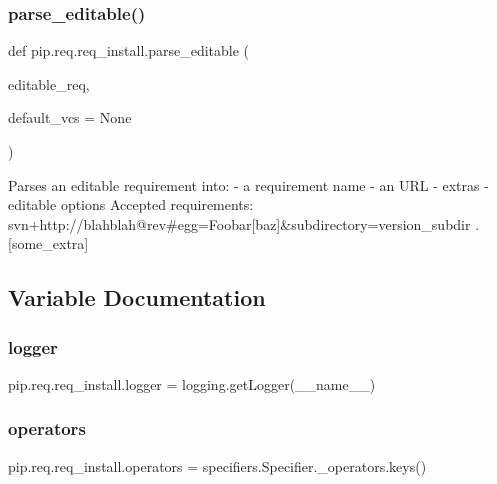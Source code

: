 \subsubsection{\texorpdfstring{parse\+\_\+editable()}{parse\_editable()}}
{\footnotesize\ttfamily def pip.\+req.\+req\+\_\+install.\+parse\+\_\+editable (\begin{DoxyParamCaption}\item[{}]{editable\+\_\+req,  }\item[{}]{default\+\_\+vcs = {\ttfamily None} }\end{DoxyParamCaption})}

\begin{DoxyVerb}Parses an editable requirement into:
    - a requirement name
    - an URL
    - extras
    - editable options
Accepted requirements:
    svn+http://blahblah@rev#egg=Foobar[baz]&subdirectory=version_subdir
    .[some_extra]
\end{DoxyVerb}
 

\subsection{Variable Documentation}
\mbox{\label{namespacepip_1_1req_1_1req__install_ae15c5cd2c51e341940f01673747a8478}} 
\subsubsection{\texorpdfstring{logger}{logger}}
{\footnotesize\ttfamily pip.\+req.\+req\+\_\+install.\+logger = logging.\+get\+Logger(\+\_\+\+\_\+name\+\_\+\+\_\+)}

\mbox{\label{namespacepip_1_1req_1_1req__install_a470d6a51215a2733e49c12bd7a5e1c72}} 
\subsubsection{\texorpdfstring{operators}{operators}}
{\footnotesize\ttfamily pip.\+req.\+req\+\_\+install.\+operators = specifiers.\+Specifier.\+\_\+operators.\+keys()}

